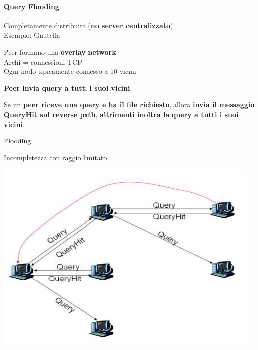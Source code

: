 \documentclass[10pt]{article}
\begin{document}
\paragraph{Query Flooding} Completamente distribuita (\textbf{no server centralizzato})\\
Esempio: Gnutella
\begin{multicols}{2}
\begin{list}{}{}
	\item Peer formano una \textbf{overlay network}\\
	Archi = connessioni TCP\\
	Ogni nodo tipicamente connesso a 10 vicini
	\item \textbf{Peer invia query a tutti i suoi vicini}
	\item Se un \textbf{peer riceve una query e ha il file richiesto}, allora \textbf{invia il messaggio QueryHit sul reverse path}, \textbf{altrimenti inoltra la query a tutti i suoi vicini}.
\end{list}
\begin{list}{}{Problemi:}
	\item Flooding
	\item Incompletezza con raggio limitato
\end{list}
\begin{center}
\includegraphics[scale=0.7]{p2pnonstruttqueryflooding.png}
\end{center}
\end{multicols}
\pagebreak
\end{document}
